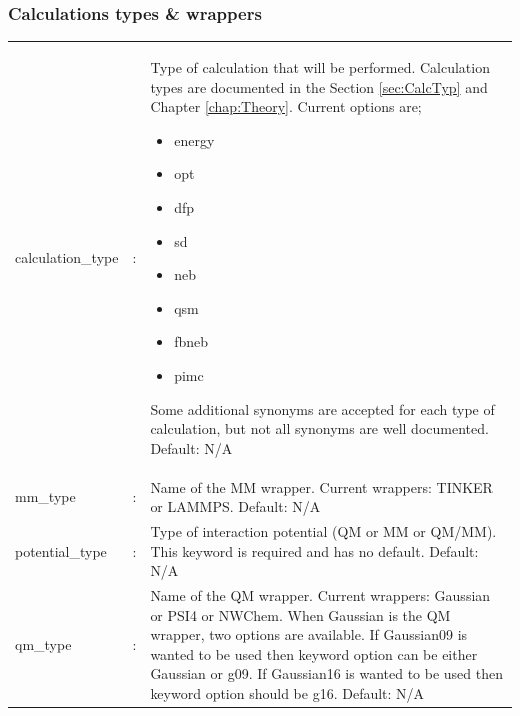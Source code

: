 \documentclass[12pt]{report}
\begin{document}
\subsubsection{Calculations types \& wrappers}
\begin{center}
\begin{longtable}{ p{4cm} c p{12.5cm}}
calculation\_type & : & Type of calculation that will be performed.
Calculation types are documented in the Section \ref{sec:CalcTyp} and
Chapter \ref{chap:Theory}.
Current options are;\newline
\begin{itemize}
\item energy
\item opt
\item dfp
\item sd
\item neb
\item qsm
\item fbneb
\item pimc\newline
\end{itemize}
Some additional synonyms are accepted for each type of calculation, but not
all synonyms are well documented.
Default: N/A \newline\\

mm\_type & : & Name of the MM wrapper.
Current wrappers: TINKER or LAMMPS.
Default: N/A \newline\\

potential\_type & : & Type of interaction potential (QM or MM or QM/MM).
This keyword is required and has no default.
Default: N/A \newline\\

qm\_type & : & Name of the QM wrapper.
Current wrappers: Gaussian or PSI4 or NWChem.
When Gaussian is the QM wrapper, two options are available.
If Gaussian09 is wanted to be used
then keyword option can be either Gaussian or
g09.
If Gaussian16 is wanted to be used
then keyword option should
be g16.
Default: N/A \\
\end{longtable}
\end{center}
\newpage
\end{document}
